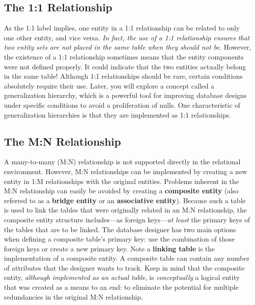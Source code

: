 \documentclass[a4paper, 12pt, titlepage]{report}
\begin{document}
{\subsection{The 1:1 Relationship}
As the 1:1 label implies, one entity in a 1:1 relationship can be related to only one other entity, and vice versa. \emph{In fact, the use of a 1:1 relationship ensures that two entity sets are not placed in the same table when they should not be}. However, the existence of a 1:1 relationship sometimes means that the entity components were not defined properly. It could indicate that the two entities actually belong in the same table! Although 1:1 relationships should be rare, certain conditions absolutely require their
use. Later, you will explore a concept called a generalization hierarchy, which is a powerful tool for improving database designs under specific conditions to avoid a proliferation of nulls. One characteristic of generalization hierarchies is that they are implemented as 1:1 relationships.
\subsection{The M:N Relationship}
A many-to-many (M:N) relationship is not supported directly in the relational environment. However, M:N relationships can be implemented by creating a new entity in 1:M
relationships with the original entities. Problems inherent in the M:N relationship can easily be avoided by creating a \textbf{composite entity} (also referred to as a \textbf{bridge entity} or an \textbf{associative entity}). Because such a table is used to link the tables that were originally related in an M:N relationship, the composite entity structure includes—as foreign keys—\emph{at least} the primary keys of the tables that are to be linked. The database designer has two main options when defining a composite table’s primary key: use the combination of those foreign keys or create a new primary key. Note a \textbf{linking table} is the implementation of a composite entity. A composite table can contain any number of attributes that the designer wants to track. Keep in mind that the composite entity, \emph{although implemented as an actual table}, is \emph{conceptually} a logical entity that was created as a means to an end: to eliminate the potential for multiple redundancies in the original M:N relationship.
}
\end{document}
